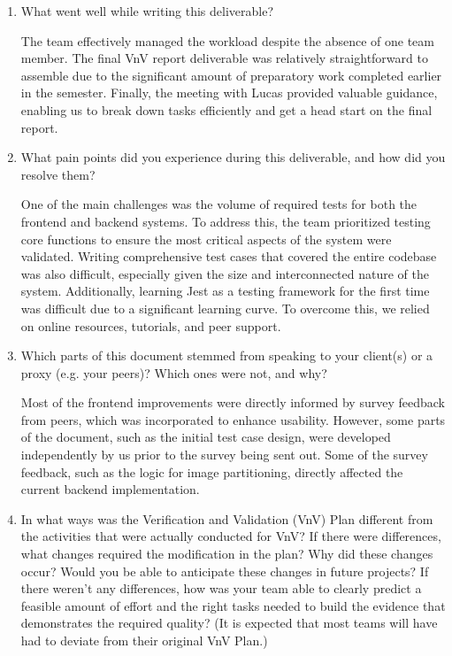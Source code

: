 \documentclass[12pt, titlepage]{article}
\begin{document}
\begin{enumerate}
    \item What went well while writing this deliverable? 
    
        The team effectively managed the workload despite the absence of one team member. The final VnV report deliverable was relatively straightforward to assemble due to the significant amount of preparatory work completed earlier in the semester. Finally, the meeting with Lucas provided valuable guidance, enabling us to break down tasks efficiently and get a head start on the final report. 
  
    \item What pain points did you experience during this deliverable, and how
      did you resolve them?
  
        One of the main challenges was the volume of required tests for both the frontend and backend systems. To address this, the team prioritized testing core functions to ensure the most critical aspects of the system were validated. Writing comprehensive test cases that covered the entire codebase was also difficult, especially given the size and interconnected nature of the system. Additionally, learning Jest as a testing framework for the first time was difficult due to a significant learning curve. To overcome this, we relied on online resources, tutorials, and peer support.
  
    \item Which parts of this document stemmed from speaking to your client(s) or
    a proxy (e.g. your peers)? Which ones were not, and why?
  
        Most of the frontend improvements were directly informed by survey feedback from peers, which was incorporated to enhance usability. However, some parts of the document, such as the initial test case design, were developed independently by us prior to the survey being sent out. Some of the survey feedback, such as the logic for image partitioning, directly affected the current backend implementation.
  
    \item In what ways was the Verification and Validation (VnV) Plan different
    from the activities that were actually conducted for VnV?  If there were
    differences, what changes required the modification in the plan?  Why did
    these changes occur?  Would you be able to anticipate these changes in future
    projects?  If there weren't any differences, how was your team able to clearly
    predict a feasible amount of effort and the right tasks needed to build the
    evidence that demonstrates the required quality?  (It is expected that most
    teams will have had to deviate from their original VnV Plan.)
  

\end{enumerate}
\end{document}
